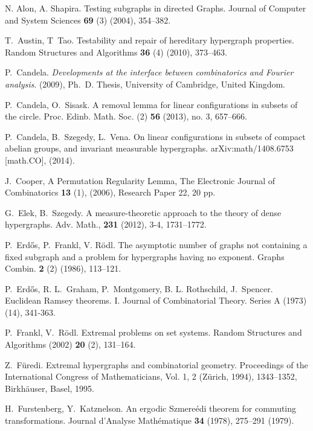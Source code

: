\documentclass[10pt]{article}
\begin{document}
\begin{thebibliography}{99}
	
	N. Alon, A. Shapira. Testing subgraphs in directed Graphs. Journal
	of Computer and System Sciences \textbf{69} (3) (2004), 354--382.
	
	T.~Austin, T~Tao. Testability and repair of hereditary hypergraph properties. Random Structures and Algorithms \textbf{36} (4) (2010), 373--463.
	
	 P.~Candela. \emph{Developments at the interface between combinatorics and Fourier analysis}. (2009), Ph.~D. Thesis, University of Cambridge, United Kingdom.
	
	 P.~Candela, O.~Sisask.
	A removal lemma for linear configurations in subsets of the circle. Proc. Edinb. Math. Soc. (2) \textbf{56} (2013), no. 3, 657--666.
	
	P.~Candela, B.~Szegedy, L.~Vena. On linear configurations in subsets of compact abelian groups, and invariant measurable hypergraphs. arXiv:math/1408.6753 [math.CO], (2014).
	
	J.~Cooper, A Permutation Regularity Lemma, The Electronic Journal of Combinatorics \textbf{13} (1), (2006), Research Paper 22, 20 pp.
	
	 G.~Elek, B.~Szegedy.
A measure-theoretic approach to the theory of dense hypergraphs. Adv. Math., \textbf{231} (2012), 3-4, 1731--1772.

P.~Erd\H{o}s, P.~Frankl, V. R\"odl.
The asymptotic number of graphs not containing a fixed subgraph and a problem for hypergraphs having no exponent. 
Graphs Combin. \textbf{2} (2) (1986), 113--121.
	
	P.~Erd\H{o}s, R. L.~Graham, P.~Montgomery, B. L. Rothschild, J.~Spencer.  Euclidean Ramsey theorems. I. Journal of Combinatorial Theory. Series A (1973) (14), 341-363.
	
	P.~Frankl, V.~R\"odl. Extremal problems on set systems. Random Structures and Algorithms (2002) \textbf{20} (2), 131--164.
	
	Z.~F\"uredi. %
	Extremal hypergraphs and combinatorial geometry. Proceedings of the International Congress of Mathematicians, Vol. 1, 2 (Zürich, 1994), 1343--1352, Birkhäuser, Basel, 1995.
	
	 H.~Furstenberg, Y.~Katznelson. An ergodic Szmere\'edi theorem for commuting transformations. Journal d'Analyse Mathématique \textbf{34} (1978), 275--291 (1979).
	

\end{thebibliography}
\end{document}
